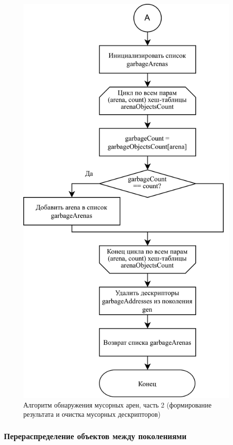 \begin{figure}[H]
	\centering
	\includegraphics[scale=0.185]{assets/sweep-3.png}
	\caption{Алгоритм обнаружения мусорных арен, часть 2 (формирование результата и очистка мусорных дескрипторов)}
	\label{fig:sweep-3}
\end{figure}

\subsubsection{Перераспределение объектов между поколениями}

